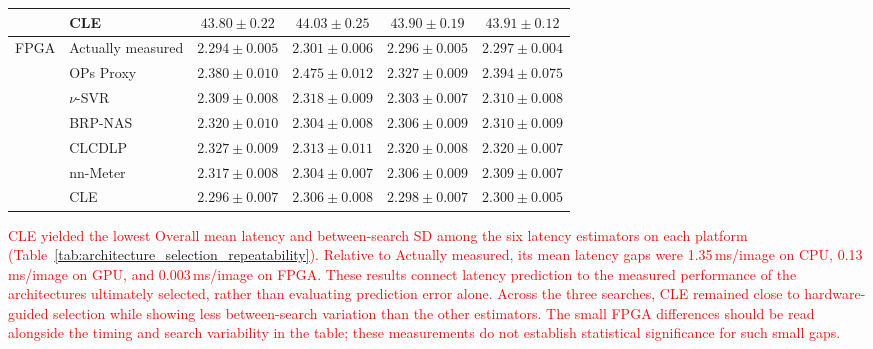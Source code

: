 \documentclass[preprint,review,12p,times]{elsarticle}
\begin{document}
\begin{table}[H]
{\begin{tabular}{llcccc}
     & CLE & $43.80\pm0.22$ & $44.03\pm0.25$ & $43.90\pm0.19$ & $43.91\pm0.12$ \\
    \midrule
    \multirow{7}{*}{FPGA} & Actually measured & $2.294\pm0.005$ & $2.301\pm0.006$ & $2.296\pm0.005$ & $2.297\pm0.004$ \\
     & OPs Proxy & $2.380\pm0.010$ & $2.475\pm0.012$ & $2.327\pm0.009$ & $2.394\pm0.075$ \\
     & $\nu$-SVR & $2.309\pm0.008$ & $2.318\pm0.009$ & $2.303\pm0.007$ & $2.310\pm0.008$ \\
     & BRP-NAS & $2.320\pm0.010$ & $2.304\pm0.008$ & $2.306\pm0.009$ & $2.310\pm0.009$ \\
     & CLCDLP & $2.327\pm0.009$ & $2.313\pm0.011$ & $2.320\pm0.008$ & $2.320\pm0.007$ \\
     & nn-Meter & $2.317\pm0.008$ & $2.304\pm0.007$ & $2.306\pm0.009$ & $2.309\pm0.007$ \\
     & CLE & $2.296\pm0.007$ & $2.306\pm0.008$ & $2.298\pm0.007$ & $2.300\pm0.005$ \\
    \bottomrule
    \end{tabular}}
\end{table}

\textcolor{red}{CLE yielded the lowest Overall mean latency and between-search SD among the six latency estimators on each platform (Table~\ref{tab:architecture_selection_repeatability}). Relative to Actually measured, its mean latency gaps were 1.35\,ms/image on CPU, 0.13\,ms/image on GPU, and 0.003\,ms/image on FPGA. These results connect latency prediction to the measured performance of the architectures ultimately selected, rather than evaluating prediction error alone. Across the three searches, CLE remained close to hardware-guided selection while showing less between-search variation than the other estimators. The small FPGA differences should be read alongside the timing and search variability in the table; these measurements do not establish statistical significance for such small gaps.}
\end{document}
